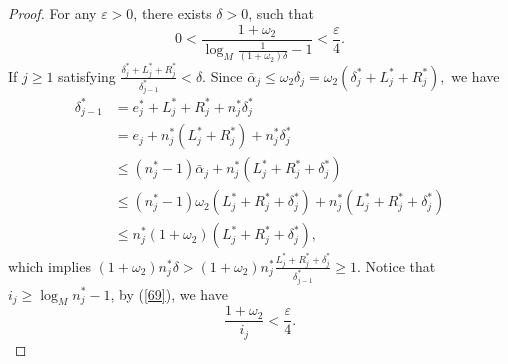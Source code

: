 \documentclass[reqno]{amsart}
\theoremstyle{plain}
\theoremstyle{definition}
\theoremstyle{remark}
\numberwithin{equation}{section} \DeclareMathOperator\intr{int}
\begin{document}
\begin{proof}
For any $\varepsilon>0$, there exists $\delta>0$, such that
\begin{equation}\label{69}
0<\frac{1+\omega_2}{\log_M\frac{1}{(1+\omega_2)\delta}-1} <\frac{\varepsilon}{4}.
\end{equation}
If $j\ge1$ satisfying $\frac{\delta^*_j+L^*_j+R^*_j}{\delta^*_{j-1}} <\delta$.
Since $\bar{\alpha}_j\le \omega_2 \delta_j=\omega_2(\delta^*_j+L^*_j+R^*_j),$ we have
\begin{equation*}
\begin{aligned}
\delta^*_{j-1} & = e^*_{j}+L^*_j+R^*_j+n^*_j\delta^*_j\\
&=e_j+n^*_j(L^*_j+R^*_j)+n^*_j\delta^*_j\\
&\le (n^*_j-1)\bar{\alpha}_j+n^*_j(L^*_j+R^*_j+\delta^*_j)\\
&\le (n^*_j-1)\omega_2 (L^*_j+R^*_j+\delta^*_j)+n^*_j(L^*_j+R^*_j+\delta^*_j)\\
&\le n^*_j(1+\omega_2)(L^*_j+R^*_j+\delta^*_j),
\end{aligned}
\end{equation*}
which implies $(1+\omega_2)n^*_j\delta>(1+\omega_2)n^*_j\frac{L^*_j+R^*_j+\delta^*_j}{\delta^*_{j-1}} \ge 1.$
Notice that $i_j\ge \log_{M}n^*_j-1$, by (\ref{69}), we have
\begin{equation}\label{ss}
\frac{1+\omega_2}{i_j} <\frac{\varepsilon }{4}.
\end{equation}


\end{proof}
\end{document}
